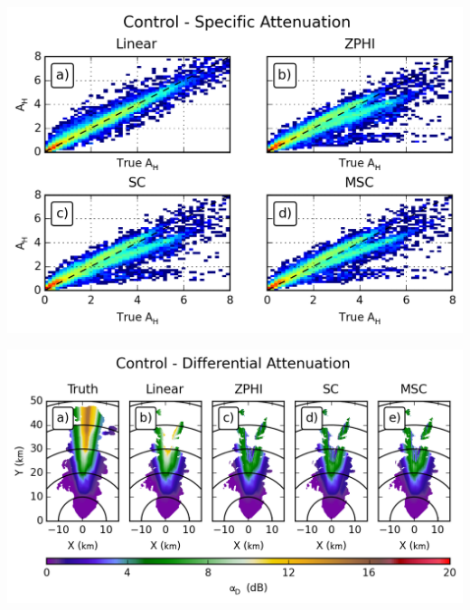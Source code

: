 \documentclass[red]{beamer}
\begin{document}
\begin{frame}
    \begin{center}
        \includegraphics[scale=0.7]{figures/X_Control_Specific_Attenuation_H_scatter}
    \end{center}
\end{frame}

\begin{frame}
    \begin{center}
        \includegraphics[scale=0.7]{figures/X_Control_Differential_Attenuation}
    \end{center}
\end{frame}
\end{document}

